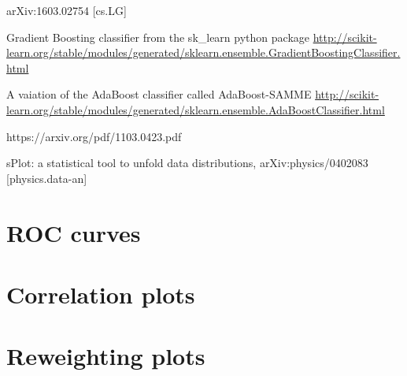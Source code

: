 \documentclass[english]{uzhpub}
\begin{document}
\begin{thebibliography}{100}
     arXiv:1603.02754 [cs.LG]

    Gradient Boosting classifier from the sk\_learn python package \url{http://scikit-learn.org/stable/modules/generated/sklearn.ensemble.GradientBoostingClassifier.html}

    A vaiation of the AdaBoost classifier called AdaBoost-SAMME \url{http://scikit-learn.org/stable/modules/generated/sklearn.ensemble.AdaBoostClassifier.html}

    https://arxiv.org/pdf/1103.0423.pdf


    sPlot: a statistical tool to unfold data distributions,
   	arXiv:physics/0402083 [physics.data-an]



 \end{thebibliography}

 \begin{appendix}
   \section{ROC curves}
   \label{app:roc}
   

   \section{Correlation plots}
   \label{app:corr}
   

   \section{Reweighting plots}
   \label{app:re}
   

 \end{appendix}

 
\end{document}
